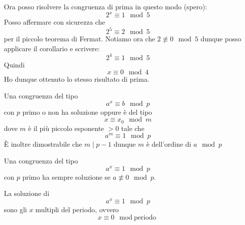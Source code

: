 \begin{example}
	Ora posso risolvere la congruenza di prima in questo modo (spero):
	\begin{equation*}
		2^x \equiv 1 \mod{5}
	\end{equation*}
	Posso affermare con sicurezza che
	\begin{equation*}
		2^5 \equiv 2 \mod{5}
	\end{equation*}
	per il piccolo teorema di Fermat. Notiamo ora che $2 \not \equiv 0 \mod{5}$ dunque posso
	applicare il corollario e scrivere:
	\begin{equation*}
		2^{4} \equiv 1 \mod{5}
	\end{equation*}
	Quindi
	\begin{equation*}
		x \equiv 0 \mod{4}
	\end{equation*}
	Ho dunque ottenuto lo stesso risultato di prima.
\end{example}

\begin{theorem}
	Una congruenza del tipo
	\begin{equation*}
		a^x \equiv b \mod{p}
	\end{equation*}
	con $p$ primo o non ha soluzione oppure \`e del tipo
	\begin{equation*}
		x \equiv x_0 \mod{m}
	\end{equation*}
	dove $m$ \`e il pi\`u piccolo esponente $> 0$ tale che
	\begin{equation*}
		a^m \equiv 1 \mod{p}
	\end{equation*}
	\`E inoltre dimostrabile che $m \mid p-1$ dunque $m$ \`e dell'ordine di $a \mod{p}$
\end{theorem}

\begin{theorem}
	Una congruenza del tipo
	\begin{equation*}
		a^x \equiv 1 \mod{p}
	\end{equation*}
	con $p$ primo ha sempre soluzione se $a \not \equiv 0 \mod{p}$.
\end{theorem}

\begin{proposition}
	La soluzione di
	\begin{equation*}
		a^x \equiv 1 \mod{p}
	\end{equation*}
	sono gli $x$ multipli del periodo, ovvero
	\begin{equation*}
		x \equiv 0 \mod{\text{periodo}}
	\end{equation*}
\end{proposition}

